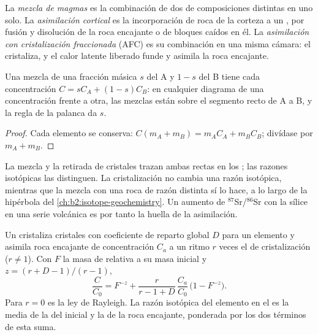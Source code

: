\begin{definition}
\label{def:b2:magmatic-differentiation:open}
La \emph{mezcla de magmas} es la combinación de dos  de
composiciones distintas en uno solo. La \emph{asimilación cortical} es la
incorporación de roca de la corteza a un , por fusión y disolución de la roca
encajante o de bloques caídos en él. La \emph{asimilación con cristalización
fraccionada} (AFC) es su
combinación en una misma cámara: el  cristaliza, y el calor latente liberado
funde y asimila la roca encajante.
\end{definition}

\begin{proposition}\label{prop:b2:magmatic-differentiation:mixing}
Una mezcla de una fracción másica $s$ del  A y $1-s$ del  B tiene cada
concentración $C = sC_A + (1-s)C_B$: en cualquier diagrama de una concentración frente a
otra, las mezclas están sobre el segmento recto de A a B, y la regla de la palanca da
$s$.
\end{proposition}

\begin{proof}
Cada elemento se conserva: $C(m_A + m_B) = m_AC_A + m_BC_B$; divídase por $m_A + m_B$.
\end{proof}

La mezcla y la retirada de cristales trazan ambas rectas en los ; las razones
isotópicas las distinguen. La cristalización no cambia una razón isotópica, mientras que
la mezcla con una roca de razón distinta sí lo hace, a lo largo de la hipérbola del
\cref{ch:b2:isotope-geochemistry}. Un aumento de $^{87}$Sr/$^{86}$Sr con la sílice en una
serie volcánica es por tanto la huella de la asimilación.

\begin{proposition}
\label{prop:b2:magmatic-differentiation:afc}
Un  cristaliza cristales con coeficiente de reparto global $D$ para un elemento
y asimila roca encajante de concentración $C_a$ a un ritmo $r$ veces el de
cristalización ($r \ne 1$). Con $F$ la masa de  relativa a su masa inicial
y $z = (r + D - 1)/(r - 1)$,
\[
\frac{C}{C_0} = F^{-z} + \frac{r}{r - 1 + D}\,\frac{C_a}{C_0}\,\bigl(1 - F^{-z}\bigr).
\]
Para $r = 0$ es la ley de Rayleigh. La razón isotópica del elemento en el 
es la media de la del  inicial y la de la roca encajante, ponderada por los
dos términos de esta suma.
\end{proposition}

